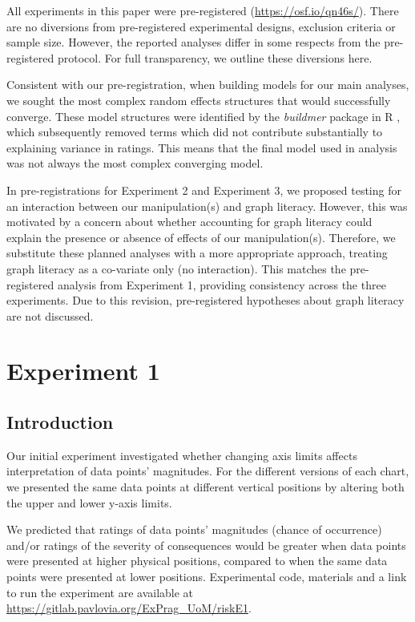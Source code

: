 \documentclass[journal]{vgtc}                %
\begin{document}
All experiments in this paper were pre-registered (\url{https://osf.io/qn46s/}). There are no diversions from pre-registered experimental designs, exclusion criteria
or sample size. However, the reported analyses differ in some respects
from the pre-registered protocol. For full transparency, we outline
these diversions here.

Consistent with our pre-registration, when building models for our main
analyses, we sought the most complex random effects structures that
would successfully converge. These model structures were identified by
the \emph{buildmer} package in R \citep{voeten_buildmer_2022}, which subsequently removed terms which did
not contribute substantially to explaining variance in ratings. This
means that the final model used in analysis was not always the most
complex converging model.

In pre-registrations for Experiment 2 and Experiment 3, we proposed
testing for an interaction between our manipulation(s) and graph
literacy. However, this was motivated by a concern about whether
accounting for graph literacy could explain the presence or absence of
effects of our manipulation(s). Therefore, we substitute these planned
analyses with a more appropriate approach, treating graph literacy as a
co-variate only (no interaction). This matches the pre-registered
analysis from Experiment 1, providing consistency across the three
experiments. Due to this revision, pre-registered hypotheses about graph
literacy are not discussed.

\hypertarget{experiment-1}{%
\section{Experiment 1}\label{experiment-1}}

\hypertarget{introduction}{%
\subsection{Introduction}\label{introduction}}

Our initial experiment investigated whether changing axis limits affects
interpretation of data points' magnitudes. For the different versions of
each chart, we presented the same data points at different vertical
positions by altering both the upper and lower y-axis limits.

We predicted that ratings of data points'
magnitudes (chance of occurrence) and/or ratings of the severity of
consequences would be greater when data points were presented at higher
physical positions, compared to when the same data points were presented
at lower positions. Experimental code, materials and a link to run the experiment are available at \url{https://gitlab.pavlovia.org/ExPrag_UoM/riskE1}.
\end{document}
